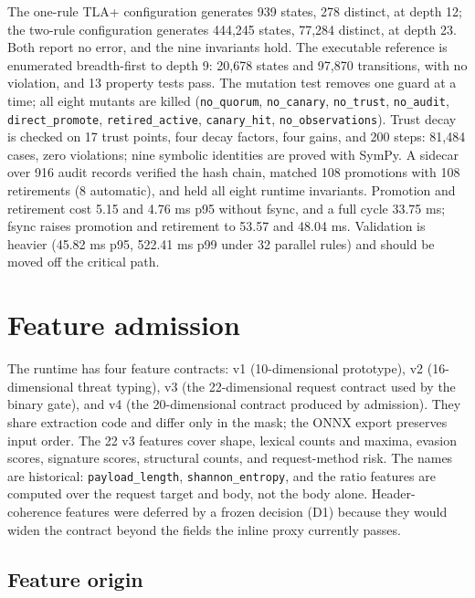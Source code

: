 \documentclass[preprint,11pt]{elsarticle}
\begin{document}
The one-rule TLA+ configuration generates 939 states, 278 distinct, at
depth 12; the two-rule configuration generates 444,245 states, 77,284
distinct, at depth 23. Both report no error, and the nine invariants
hold. The executable reference is enumerated breadth-first to depth 9:
20,678 states and 97,870 transitions, with no violation, and 13 property
tests pass. The mutation test removes one guard at a time; all eight
mutants are killed (\texttt{no\_\allowbreak{}quorum}, \texttt{no\_\allowbreak{}canary},
\texttt{no\_\allowbreak{}trust}, \texttt{no\_\allowbreak{}audit}, \texttt{direct\_\allowbreak{}promote},
\texttt{retired\_\allowbreak{}active}, \texttt{canary\_\allowbreak{}hit},
\texttt{no\_\allowbreak{}observations}). Trust decay is checked on 17 trust points,
four decay factors, four gains, and 200 steps: 81,484 cases, zero
violations; nine symbolic identities are proved with SymPy. A sidecar
over 916 audit records verified the hash chain, matched 108 promotions
with 108 retirements (8 automatic), and held all eight runtime
invariants. Promotion and retirement cost 5.15 and 4.76 ms p95 without
fsync, and a full cycle 33.75 ms; fsync raises promotion and retirement
to 53.57 and 48.04 ms. Validation is heavier (45.82 ms p95, 522.41 ms
p99 under 32 parallel rules) and should be moved off the critical path.

\section{Feature admission}\label{feature-admission}

The runtime has four feature contracts: v1 (10-dimensional prototype),
v2 (16-dimensional threat typing), v3 (the 22-dimensional request
contract used by the binary gate), and v4 (the 20-dimensional contract
produced by admission). They share extraction code and differ only in
the mask; the ONNX export preserves input order. The 22 v3 features
cover shape, lexical counts and maxima, evasion scores, signature
scores, structural counts, and request-method risk. The names are
historical: \texttt{payload\_\allowbreak{}length}, \texttt{shannon\_\allowbreak{}entropy}, and the
ratio features are computed over the request target and body, not the
body alone. Header-coherence features were deferred by a frozen decision
(D1) because they would widen the contract beyond the fields the inline
proxy currently passes.

\subsection{Feature origin}\label{feature-origin}
\end{document}
